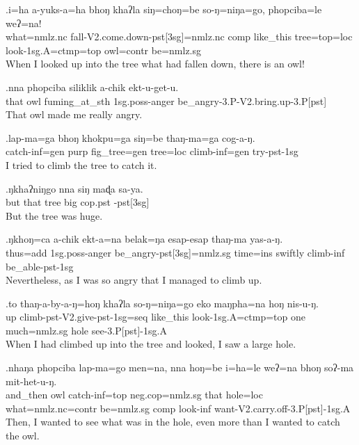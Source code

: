 \exg.i=ha                a-yuks-a=ha                                     bhoŋ khaʔla   siŋ=choŋ=be        so-ŋ=niŋa=go,              phopciba=le          weʔ=na!\\
 what{\sc =nmlz.nc} fall{\sc -V2.come.down-pst[3sg]=nmlz.nc} {\sc comp}  like\_this tree{\sc =top=loc} look{\sc -1sg.A=ctmp=top}  owl{\sc =contr} be{\sc [3sg]=nmlz.sg}\\
When I looked up into the tree what had fallen down, there is an owl!

\exg.nna  phopciba siliklik    a-chik           ekt-u-get-u.\\
 that owl      fuming\_at\_sth {\sc 1sg.poss-}anger be\_angry{\sc -3.P-V2.bring.up-3.P[pst]}\\
That owl made me really angry.

\exg.lap-ma=ga         bhoŋ khokpu=ga      siŋ=be    thaŋ-ma=ga       cog-a-ŋ.\\
 catch{\sc -inf=gen} {\sc purp} fig\_tree{\sc =gen} tree{\sc =loc} climb{\sc -inf=gen} try{\sc -pst-1sg}\\
I tried to climb the tree to catch it.

\exg.ŋkhaʔniŋgo nna  siŋ maɖa sa-ya.\\
 but           that tree big   {\sc cop.pst -pst[3sg]}\\
But the tree was huge.

\exg.ŋkhoŋ=ca        a-chik           ekt-a=na                        belak=ŋa  esap-esap thaŋ-ma    yas-a-ŋ.\\
 thus{\sc =add} {\sc 1sg.poss-}anger be\_angry{\sc -pst[3sg]=nmlz.sg} time{\sc =ins} swiftly   climb{\sc -inf} be\_able{\sc -pst-1sg}\\
Nevertheless, as I was so angry that I managed to climb up.

\exg.to  thaŋ-a-by-a-ŋ=hoŋ                       khaʔla   so-ŋ=niŋa=go              eko maŋpha=na        hoŋ nis-u-ŋ.\\
 up  climb{\sc -pst-V2.give-pst-1sg=seq}  like\_this look{\sc -1sg.A=ctmp=top}  one much{\sc =nmlz.sg} hole see{\sc -3.P[pst]-1sg.A}\\
When I had climbed up into the tree and looked, I saw a large hole.

\exg.nhaŋa   phopciba lap-ma=go          men=na,            nna  hoŋ=be    i=ha=le                         weʔ=na        bhoŋ soʔ-ma    mit-het-u-ŋ.\\
 and\_then owl      catch{\sc -inf=top}  {\sc neg.cop=nmlz.sg} that hole{\sc =loc} what{\sc =nmlz.nc=contr} be{\sc [3sg]=nmlz.sg} {\sc comp}  look{\sc -inf} want{\sc -V2.carry.off-3.P[pst]-1sg.A}\\
Then, I wanted to see what was in the hole, even more than I wanted to catch the owl.

